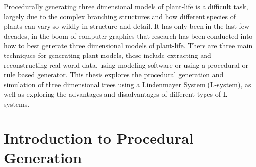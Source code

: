 \begin{flushleft}

Procedurally generating three dimensional models of plant-life is a difficult task, largely due to the complex branching structures and how different species of plants can vary so wildly in structure and detail. It has only been in the last few decades, in the boom of computer graphics that research has been conducted into how to best generate three dimensional models of plant-life. There are three main techniques for generating plant models, these include extracting and reconstructing real world data, using modeling software or using a procedural or rule based generator. This thesis explores the procedural generation and simulation of three dimensional trees using a Lindenmayer System (L-system), as well as exploring the advantages and disadvantages of different types of L-systems.

\end{flushleft}

\section{Introduction to Procedural Generation}

